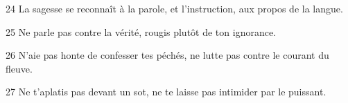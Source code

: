 
24 La sagesse se reconnaît à la parole, et l’instruction, aux propos de la langue.

25 Ne parle pas contre la vérité, rougis plutôt de ton ignorance.

26 N’aie pas honte de confesser tes péchés, ne lutte pas contre le courant du fleuve.

27 Ne t’aplatis pas devant un sot, ne te laisse pas intimider par le puissant.
